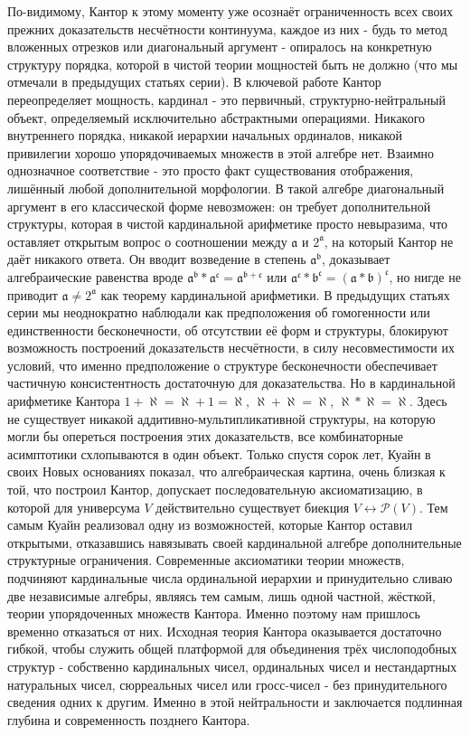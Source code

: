 \documentclass[12pt]{article}
\begin{document}
По-видимому, Кантор к этому моменту уже осознаёт ограниченность всех своих прежних доказательств несчётности континуума, каждое из них - будь то метод вложенных отрезков или диагональный аргумент - опиралось на конкретную структуру порядка, которой в чистой теории мощностей быть не должно (что мы отмечали в предыдущих статьях серии). В ключевой работе Кантор переопределяет мощность, кардинал - это первичный, структурно-нейтральный объект, определяемый исключительно абстрактными операциями. Никакого внутреннего порядка, никакой иерархии начальных ординалов, никакой привилегии хорошо упорядочиваемых множеств в этой алгебре нет. Взаимно однозначное соответствие - это просто факт существования отображения, лишённый любой дополнительной морфологии. В такой алгебре диагональный аргумент в его классической форме невозможен: он требует дополнительной структуры, которая в чистой кардинальной арифметике просто невыразима, что оставляет открытым вопрос о соотношении между $\mathfrak{a}$ и $2^{\mathfrak{a}}$, на который Кантор не даёт никакого ответа. Он вводит возведение в степень $\mathfrak{a}^{\mathfrak{b}}$, доказывает алгебраические равенства вроде $\mathfrak{a}^{\mathfrak{b}}*\mathfrak{a}^{\mathfrak{c}} = \mathfrak{a}^{\mathfrak{b} + \mathfrak{c}}$ или $\mathfrak{a}^{\mathfrak{c}}*\mathfrak{b}^{\mathfrak{c}} = (\mathfrak{a}*\mathfrak{b})^{\mathfrak{c}}$, но нигде не приводит $\mathfrak{a} \neq 2^{\mathfrak{a}}$ как теорему кардинальной арифметики. В предыдущих статьях серии мы неоднократно наблюдали как предположения об гомогенности или единственности бесконечности, об отсутствии её форм и структуры, блокируют возможность построений доказательств несчётности, в силу несовместимости их условий, что именно предположение о структуре бесконечности обеспечивает частичную консистентность достаточную для доказательства. Но в кардинальной арифметике Кантора $1 + \aleph = \aleph + 1 = \aleph$, $\aleph + \aleph = \aleph$, $\aleph*\aleph = \aleph$. Здесь не существует никакой аддитивно-мультипликативной структуры, на которую могли бы опереться построения этих доказательств, все комбинаторные асимптотики схлопываются в один объект. Только спустя сорок лет, Куайн в своих Новых основаниях показал, что алгебраическая картина, очень близкая к той, что построил Кантор, допускает последовательную аксиоматизацию, в которой для универсума $V$ действительно существует биекция $V \leftrightarrow \mathcal{P}(V)$. Тем самым Куайн реализовал одну из возможностей, которые Кантор оставил открытыми, отказавшись навязывать своей кардинальной алгебре дополнительные структурные ограничения. Современные аксиоматики теории множеств, подчиняют кардинальные числа ординальной иерархии и принудительно сливаю две независимые алгебры, являясь тем самым, лишь одной частной, жёсткой, теории упорядоченных множеств Кантора. Именно поэтому нам пришлось временно отказаться от них. Исходная теория Кантора оказывается достаточно гибкой, чтобы служить общей платформой для объединения трёх числоподобных структур - собственно кардинальных чисел, ординальных чисел и нестандартных натуральных чисел, сюрреальных чисел или гросс-чисел - без принудительного сведения одних к другим. Именно в этой нейтральности и заключается подлинная глубина и современность позднего Кантора.
\end{document}
